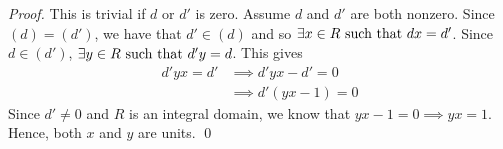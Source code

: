 \begin{proof}
    This is trivial if $d$ or $d'$ is zero. Assume $d$ and $d'$ are both nonzero. Since $(d) = (d')$, we have that $d' \in (d)$ and so $\exists x \in R \text{ such that } dx = d'$. Since $d \in (d')$, $\exists y \in R \text{ such that } d'y = d$. This gives
    \begin{align*}
        d'yx = d' &\implies d'yx - d' = 0 \\
        &\implies d'(yx - 1) = 0
    \end{align*}
    Since $d' \neq 0$ and $R$ is an integral domain, we know that $yx - 1 = 0 \implies yx = 1$. Hence, both $x$ and $y$ are units.
    \qed
\end{proof}